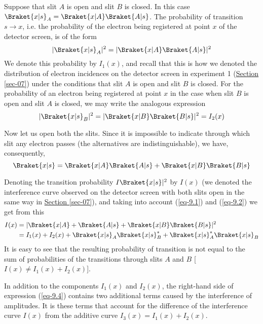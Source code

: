 \documentclass[a4paper,sfsidenotes,colorlinks=true]{tufte-book}
\numberwithin{equation}{section}
\numberwithin{figure}{section}
\begin{document}
Suppose that slit $A$ is open and slit $B$ is closed. In this case
$\Braket{x |s}_{A} = \Braket{x|A} \Braket{A|s}$. The probability of
transition $s \to  x$, i.e. the probability of the electron being
registered at point $x$ of the detector screen, is of the form
\begin{equation}%
|\Braket{x|s}_{A}|^{2} = |\Braket{x|A} \Braket{A|s}|^{2}
\label{eq-9.1} 
\end{equation}
We denote this probability by $I_{1} (x)$, and recall that this is how
we denoted the distribution of electron incidences on the detector
screen in experiment 1 (\hyperref[sec-07]{Section \ref{sec-07}}) under
the conditions that slit $A$ is open and slit $B$ is closed. For the
probability of an electron being registered at point $x$ in the case
when slit $B$ is open and slit $A$ is closed, we may write the analogous
expression
\begin{equation}%
|\Braket{x|s}_{B}|^{2} = |\Braket{x|B} \Braket{B|s}|^{2} = I_{2}(x)
\label{eq-9.2} 
\end{equation}

Now let us open both the slits. Since it is impossible to indicate
through which slit any electron passes (the alternatives are
indistinguishable), we have, consequently,
\begin{equation}%
\Braket{x|s} = \Braket{x|A} \Braket{A|s} +  \Braket{x|B} \Braket{B|s}
\label{eq-9.3} 
\end{equation}

Denoting the transition probability $I \Braket{x | s}|^{2}$ by $I (x)$
(we denoted the interference curve observed on the detector screen
with both slits open in the same way in \hyperref[sec-07]{Section
  \ref{sec-07}}), and taking into account (\ref{eq-9.1}) and (\ref{eq-9.2}) we get from
  this
\begin{equation}
\begin{split}
I(x) & = | \Braket{x | A} + \Braket{A|s} + \Braket{x|B} \Braket{B|s} |^2\\
& = I_{1}(x) + I_{2}(x) + \Braket{x|s}_{A} \Braket{x|s}_{B}^{*} + \Braket{x|s}_{A}^{*}\Braket{x|s}_{B} 
\end{split}
\label{eq-9.4}
\end{equation}
It is easy to see that the resulting probability of transition is not
equal to the sum of probabilities of the transitions through slits $A$
and $B$ [$I (x) \ne  I_{1}(x) + I_{2}(x)$].

In addition to the components $I_{1}(x)$ and $I_{2}(x)$, the right-hand side
of expression (\ref{eq-9.4}) contains two additional terms caused by
the interference	of amplitudes. It is these terms that account
for the difference of the interference curve $I(x)$ from the additive
curve  $I_{3}(x) = I_{1}(x) + I_{2}(x)$.
\end{document}
